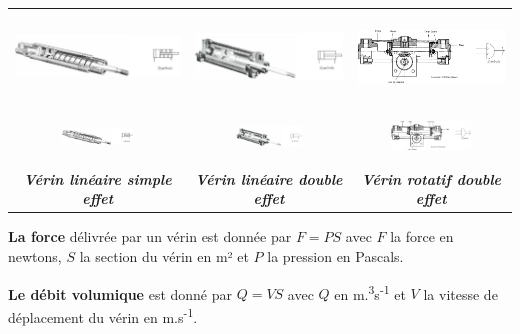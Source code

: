 \begin{center}
\begin{tabular}{ccc}
\includegraphics[width=2.18753in,height=0.78785in]{media/image77.png} &
\includegraphics[width=1.94972in,height=0.85305in]{media/image78.png} &
\includegraphics[width=1.95945in,height=0.94776in]{media/image79.png} \\
\includegraphics[width=0.7365in,height=0.38835in]{media/image80.png} &
\includegraphics[width=0.68657in,height=0.4208in]{media/image81.png} &
\includegraphics[width=0.83815in,height=0.50289in]{media/image82.png} \\
\emph{\textbf{Vérin linéaire simple effet}} & \emph{\textbf{Vérin
linéaire double effet}} & \emph{\textbf{Vérin rotatif double effet}} \\
\end{tabular}
\end{center}

\textbf{La force} délivrée par un vérin est donnée par \(F = PS\) avec
\(F\) la force en newtons, \(S\) la section du vérin en m² et \(P\) la
pression en Pascals.

\textbf{Le débit volumique} est donné par \(Q = VS\) avec \(Q\) en
m.\textsuperscript{3}s\textsuperscript{-1} et \(V\) la vitesse de
déplacement du vérin en m.s\textsuperscript{-1}.


